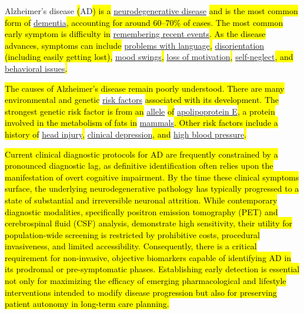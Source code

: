 \documentclass[12pt,a4paper]{article}
\begin{document}
Alzheimer's disease \hl{(}AD\hl{) is a} \href{https://en.wikipedia.org/wiki/Neurodegenerative_disease}{neurodegenerative disease} \hl{and is the most common form of} \href{https://en.wikipedia.org/wiki/Dementia}{dementia}\hl{, accounting for around 60--70\% of cases. The most common early symptom is difficulty in} \href{https://en.wikipedia.org/wiki/Short-term_memory}{remembering recent events}\hl{. As the disease advances, symptoms can include} \href{https://en.wikipedia.org/wiki/Aphasia}{problems with language}\hl{,} \href{https://en.wikipedia.org/wiki/Orientation_(mental)}{disorientation} \hl{(including easily getting lost),} \href{https://en.wikipedia.org/wiki/Mood_swing}{mood swings}\hl{,} \href{https://en.wikipedia.org/wiki/Apathy}{loss of motivation}\hl{,} \href{https://en.wikipedia.org/wiki/Self-neglect}{self-neglect}\hl{, and} \href{https://en.wikipedia.org/wiki/Challenging_behaviour}{behavioral issues}\hl{.}

\hl{The causes of Alzheimer's disease remain poorly understood. There are many environmental and genetic} \href{https://en.wikipedia.org/wiki/Risk_factor}{risk factors} \hl{associated with its development. The strongest genetic risk factor is from an} \href{https://en.wikipedia.org/wiki/Allele}{allele} \hl{of} \href{https://en.wikipedia.org/wiki/Apolipoprotein_E}{apolipoprotein E}\hl{, a protein involved in the metabolism of fats in} \href{https://en.wikipedia.org/wiki/Mammals}{mammals}\hl{. Other risk factors include a history of} \href{https://en.wikipedia.org/wiki/Head_injury}{head injury}\hl{,} \href{https://en.wikipedia.org/wiki/Clinical_depression}{clinical depression}\hl{, and} \href{https://en.wikipedia.org/wiki/High_blood_pressure}{high blood pressure}\hl{.}

\hl{Current clinical diagnostic protocols for AD are frequently constrained by a pronounced diagnostic lag, as definitive identification often relies upon the manifestation of overt cognitive impairment. By the time these clinical symptoms surface, the underlying neurodegenerative pathology has typically progressed to a state of substantial and irreversible neuronal attrition. While contemporary diagnostic modalities, specifically positron emission tomography (PET) and cerebrospinal fluid (CSF) analysis, demonstrate high sensitivity, their utility for population-wide screening is restricted by prohibitive costs, procedural invasiveness, and limited accessibility. Consequently, there is a critical requirement for non-invasive, objective biomarkers capable of identifying AD in its prodromal or pre-symptomatic phases. Establishing early detection is essential not only for maximizing the efficacy of emerging pharmacological and lifestyle interventions intended to modify disease progression but also for preserving patient autonomy in long-term care planning.}
\end{document}
